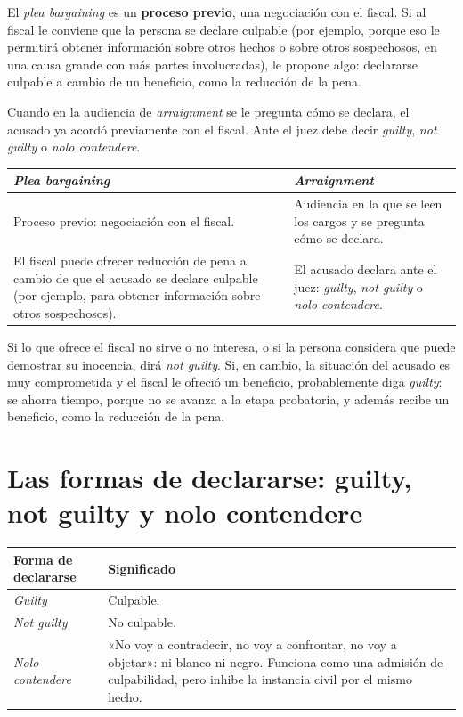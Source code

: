 \documentclass[12pt,oneside]{book}
\begin{document}
El \textit{plea bargaining} es un \textbf{proceso previo}, una negociación con el fiscal. Si al fiscal le conviene que la persona se declare culpable (por ejemplo, porque eso le permitirá obtener información sobre otros hechos o sobre otros sospechosos, en una causa grande con más partes involucradas), le propone algo: declararse culpable a cambio de un beneficio, como la reducción de la pena.

Cuando en la audiencia de \textit{arraignment} se le pregunta cómo se declara, el acusado ya acordó previamente con el fiscal. Ante el juez debe decir \textit{guilty}, \textit{not guilty} o \textit{nolo contendere}.

\begin{table}[H]
\centering
\begin{tabularx}{\textwidth}{LL}
\toprule
\textbf{\textit{Plea bargaining}} & \textbf{\textit{Arraignment}} \\
\midrule
Proceso previo: negociación con el fiscal. & Audiencia en la que se leen los cargos y se pregunta cómo se declara. \\
El fiscal puede ofrecer reducción de pena a cambio de que el acusado se declare culpable (por ejemplo, para obtener información sobre otros sospechosos). & El acusado declara ante el juez: \textit{guilty}, \textit{not guilty} o \textit{nolo contendere}. \\
\bottomrule
\end{tabularx}
\end{table}

Si lo que ofrece el fiscal no sirve o no interesa, o si la persona considera que puede demostrar su inocencia, dirá \textit{not guilty}. Si, en cambio, la situación del acusado es muy comprometida y el fiscal le ofreció un beneficio, probablemente diga \textit{guilty}: se ahorra tiempo, porque no se avanza a la etapa probatoria, y además recibe un beneficio, como la reducción de la pena.

\section{Las formas de declararse: guilty, not guilty y nolo contendere}

\begin{table}[H]
\centering
\begin{tabularx}{\textwidth}{P{3.6cm}L}
\toprule
\textbf{Forma de declararse} & \textbf{Significado} \\
\midrule
\textit{Guilty} & Culpable. \\
\textit{Not guilty} & No culpable. \\
\textit{Nolo contendere} & «No voy a contradecir, no voy a confrontar, no voy a objetar»: ni blanco ni negro. Funciona como una admisión de culpabilidad, pero inhibe la instancia civil por el mismo hecho. \\
\bottomrule
\end{tabularx}
\end{table}
\end{document}
